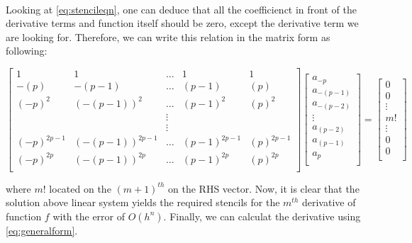 \documentclass[letterpaper,12pt]{article}
\begin{document}
\paragraph{}Looking at \eqref{eq:stencileqn}, one can deduce that all the coefficienct in front of the derivative terms and function itself should be zero, except the derivative term we are looking for. Therefore, we can write this relation in the matrix form as following:

\begin{equation*}
    \begin{bmatrix}
        1 & 1 & \dots & 1 & 1\\
        -(p) & -(p-1) & \dots & (p-1) & (p) \\
        (-p)^2 & (-(p-1))^2 & \dots & (p-1)^2 & (p)^2 \\  
        & & \vdots & & \\   
        & & \vdots & & \\   
        (-p)^{2p-1} & (-(p-1))^{2p-1} & \dots & (p-1)^{2p-1} & (p)^{2p-1} \\ 
        (-p)^{2p} & (-(p-1))^{2p} & \dots & (p-1)^{2p} & (p)^{2p} \\ 
    \end{bmatrix}
    \begin{bmatrix}
        a_{-p} \\
        a_{-(p-1)} \\
        a_{-(p-2)} \\
        \vdots \\
        a_{(p-2)} \\
        a_{(p-1)} \\
        a_{p} \\
    \end{bmatrix} = 
    \begin{bmatrix}
        0 \\
        0 \\
        \vdots \\
        m! \\
        \vdots \\
        0 \\
        0\\
    \end{bmatrix}
\end{equation*}

where $m!$ located on the $(m+1)^{th}$ on the RHS vector. Now, it is clear that the solution above linear system yields the required stencils for the $m^{th}$ derivative of function $f$ with the error of $O(h^n)$. Finally, we can calculat the derivative using \eqref{eq:generalform}.
\end{document}
